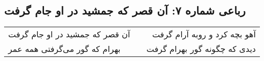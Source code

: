 \begin{center}
\section*{رباعی شماره ۷: آن قصر که جمشید در او جام گرفت}
\label{sec:sh007}
\begin{longtable}{l p{0.5cm} r}
آن قصر که جمشید در او جام گرفت
&&
آهو بچه کرد و روبه آرام گرفت
\\
بهرام که گور می‌گرفتی همه عمر
&&
دیدی که چگونه گور بهرام گرفت
\\
\end{longtable}
\end{center}
